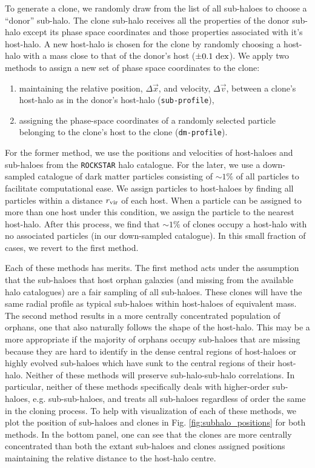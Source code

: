 \documentclass[a4paper,fleqn,usenatbib]{mnras}
\begin{document}
To generate a clone, we randomly draw from the list of all sub-haloes to choose a ``donor'' sub-halo.  The clone sub-halo receives all the properties of the donor sub-halo except its phase space coordinates and those properties associated with it's host-halo.  A new host-halo is chosen for the clone by randomly choosing a host-halo with a mass close to that of the donor's host ($\pm 0.1~ {\rm dex}$).  We apply two methods to assign a new set of phase space coordinates to the clone:
\begin{enumerate}
\item maintaining the relative position, $\Delta \vec{x}$, and velocity, $\Delta \vec{v}$, between a clone's host-halo as in the donor's host-halo ({\tt sub-profile}),
\item assigning the phase-space coordinates of a randomly selected particle belonging to the clone's host to the clone ({\tt dm-profile}).
\end{enumerate}
For the former method, we use the positions and velocities of host-haloes and sub-haloes from the {\tt ROCKSTAR} halo catalogue.  For the later, we use a down-sampled catalogue of dark matter particles consisting of $\sim 1\%$ of all particles to facilitate computational ease.  We assign particles to host-haloes by finding all particles within a distance $r_{\rm vir}$ of each host.  When a particle can be assigned to more than one host under this condition, we assign the particle to the nearest host-halo.  After this process, we find that $\sim 1\%$ of clones occupy a host-halo with no associated particles (in our down-sampled catalogue).  In this small fraction of cases, we revert to the first method.   

Each of these methods has merits.  The first method acts under the assumption that the sub-haloes that host orphan galaxies (and missing from the available halo catalogues) are a fair sampling of all sub-haloes.  These clones will have the same radial profile as typical sub-haloes within host-haloes of equivalent mass.  The second method results in a more centrally concentrated population of orphans, one that also naturally follows the shape of the host-halo.  This may be a more appropriate if the majority of orphans occupy sub-haloes that are missing because they are hard to identify in the dense central regions of host-haloes or highly evolved sub-haloes which have sunk to the central regions of their host-halo.  Neither of these methods will preserve sub-halo-sub-halo correlations.  In particular, neither of these methods specifically deals with higher-order sub-haloes, e.g. sub-sub-haloes, and treats all sub-haloes regardless of order the same in the cloning process.  To help with visualization of each of these methods, we plot the position of sub-haloes and clones in Fig. \ref{fig:subhalo_positions} for both methods.  In the bottom panel, one can see that the clones are more centrally concentrated than both the extant sub-haloes and clones assigned positions maintaining the relative distance to the host-halo centre. 
  
\end{document}
